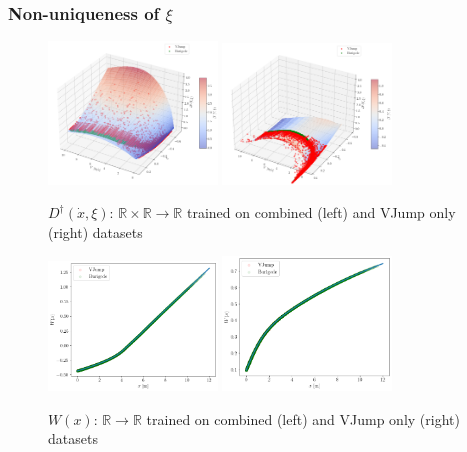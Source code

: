 \subsubsection{Non-uniqueness of $\xi$}
\begin{figure}[H]
    \centering
    \includegraphics[width=0.4\textwidth]{images/Trial0112_combined_D_dagger_normal.png}
    \includegraphics[width=0.4\textwidth]{images/Trial0112_smallA_smallDRS_D_dagger_normal.png}
    \caption{$D^\dagger(\dot{x}, \xi)$: $\mathbb{R}\times\mathbb{R}\rightarrow \mathbb{R}$ trained on combined (left) and VJump only (right) datasets}
    \label{fig:DDaggerPlotCompare}
\end{figure}
\begin{figure}[H]
    \centering
    \includegraphics[width=0.4\textwidth]{images/Trial0112_combined_W.png}
    \includegraphics[width=0.4\textwidth]{images/Trial0112_smallA_smallDRS_W.png}
    \caption{$W(x)$: $\mathbb{R} \rightarrow \mathbb{R}$ trained on combined (left) and VJump only (right) datasets}
    \label{fig:DDaggerPlotCompare}
\end{figure}
